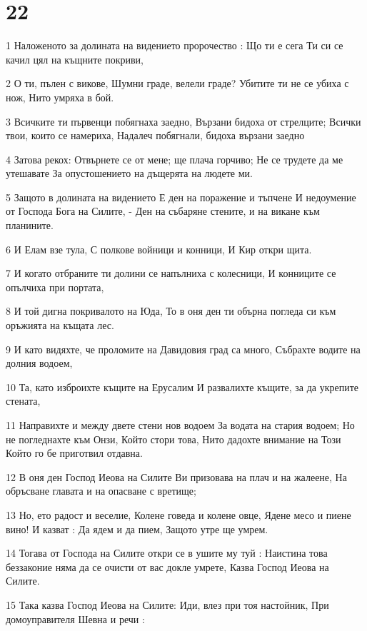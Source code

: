 \chapter{22}

\par 1 Наложеното за долината на видението пророчество : Що ти е сега Ти си се качил цял на къщните покриви,
\par 2 О ти, пълен с викове, Шумни граде, велели граде? Убитите ти не се убиха с нож, Нито умряха в бой.
\par 3 Всичките ти първенци побягнаха заедно, Вързани бидоха от стрелците; Всички твои, които се намериха, Надалеч побягнали, бидоха вързани заедно
\par 4 Затова рекох: Отвърнете се от мене; ще плача горчиво; Не се трудете да ме утешавате За опустошението на дъщерята на людете ми.
\par 5 Защото в долината на видението Е ден на поражение и тъпчене И недоумение от Господа Бога на Силите, - Ден на събаряне стените, и на викане към планините.
\par 6 И Елам взе тула, С полкове войници и конници, И Кир откри щита.
\par 7 И когато отбраните ти долини се напълниха с колесници, И конниците се опълчиха при портата,
\par 8 И той дигна покривалото на Юда, То в оня ден ти обърна погледа си към оръжията на къщата лес.
\par 9 И като видяхте, че проломите на Давидовия град са много, Събрахте водите на долния водоем,
\par 10 Та, като изброихте къщите на Ерусалим И развалихте къщите, за да укрепите стената,
\par 11 Направихте и между двете стени нов водоем За водата на стария водоем; Но не погледнахте към Онзи, Който стори това, Нито дадохте внимание на Този Който го бе приготвил отдавна.
\par 12 В оня ден Господ Иеова на Силите Ви призовава на плач и на жалеене, На обръсване главата и на опасване с вретище;
\par 13 Но, ето радост и веселие, Колене говеда и колене овце, Ядене месо и пиене вино! И казват : Да ядем и да пием, Защото утре ще умрем.
\par 14 Тогава от Господа на Силите откри се в ушите му туй : Наистина това беззаконие няма да се очисти от вас докле умрете, Казва Господ Иеова на Силите.
\par 15 Така казва Господ Иеова на Силите: Иди, влез при тоя настойник, При домоуправителя Шевна и речи :
